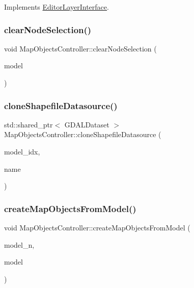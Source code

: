 Implements \mbox{\hyperlink{class_editor_layer_interface_a7e886341490323a003ccdd497f339dcc}{Editor\+Layer\+Interface}}.

\mbox{\label{class_map_objects_controller_a55368b853ad3ae3849026b3bacdf6bb5}} 
\subsubsection{\texorpdfstring{clearNodeSelection()}{clearNodeSelection()}}
{\footnotesize\ttfamily void Map\+Objects\+Controller\+::clear\+Node\+Selection (\begin{DoxyParamCaption}\item[{int}]{model }\end{DoxyParamCaption})}

\mbox{\label{class_map_objects_controller_a99b3d4cfbe9826a61aa9bc4cd6695c13}} 
\subsubsection{\texorpdfstring{cloneShapefileDatasource()}{cloneShapefileDatasource()}}
{\footnotesize\ttfamily std\+::shared\+\_\+ptr$<$ G\+D\+A\+L\+Dataset $>$ Map\+Objects\+Controller\+::clone\+Shapefile\+Datasource (\begin{DoxyParamCaption}\item[{int}]{model\+\_\+idx,  }\item[{const Q\+String \&}]{name }\end{DoxyParamCaption})}

\mbox{\label{class_map_objects_controller_afc842acfedf664454d9255b34100fd3d}} 
\subsubsection{\texorpdfstring{createMapObjectsFromModel()}{createMapObjectsFromModel()}}
{\footnotesize\ttfamily void Map\+Objects\+Controller\+::create\+Map\+Objects\+From\+Model (\begin{DoxyParamCaption}\item[{int}]{model\+\_\+n,  }\item[{\mbox{\hyperlink{class_displace_model}{Displace\+Model}} $\ast$}]{model }\end{DoxyParamCaption})}

